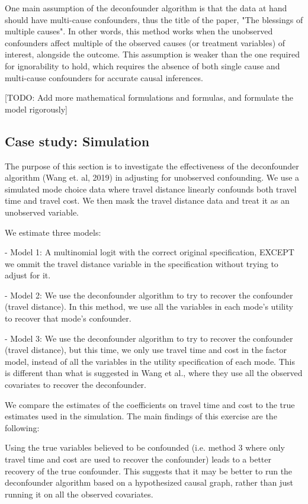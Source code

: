 One main assumption of the deconfounder algorithm is that the data at hand 
should have multi-cause confounders, thus the title of the paper, "The 
blessings of multiple causes". In other words, this method works when the 
unobserved confounders affect multiple of the observed causes (or treatment 
variables) of interest, alongside the outcome. This assumption is weaker than 
the one required for ignorability to hold, which requires the absence of both 
single cause and multi-cause confounders for accurate causal inferences. 


[TODO: Add more mathematical formulations and formulas, and formulate the 
model rigorously]


\subsection{Case study: Simulation}


The purpose of this section is to investigate the effectiveness of the 
deconfounder algorithm (Wang et. al, 2019) in adjusting for unobserved 
confounding. We use a simulated mode choice data where travel distance 
linearly confounds both travel time and travel cost. We then mask the travel 
distance data and treat it as an unobserved variable. 


We estimate three models:


	- Model 1: A multinomial logit with the correct original specification, 
	EXCEPT we ommit the travel distance variable in the specification without 
	trying to adjust for it.

	- Model 2: We use the deconfounder algorithm to try to recover the 
	confounder (travel distance). In this method, we use all the variables in 
	each mode's utility to recover that mode's confounder.

	- Model 3: We use the deconfounder algorithm to try to recover the 
	confounder (travel distance), but this time, we only use travel time and 
	cost in the factor model, instead of all the variables in the utility 
	specification of each mode. This is different than what is suggested in 
	Wang et al., where they use all the observed covariates to recover the 
	deconfounder. 


We compare the estimates of the coefficients on travel time and cost to the 
true estimates used in the simulation. The main findings of this exercise are 
the following:


Using the true variables believed to be confounded (i.e. method 3 where only 
travel time and cost are used to recover the confounder) leads to a better 
recovery of the true confounder. This suggests that it may be better to run 
the deconfounder algorithm based on a hypothesized causal graph, rather than 
just running it on all the observed covariates.

